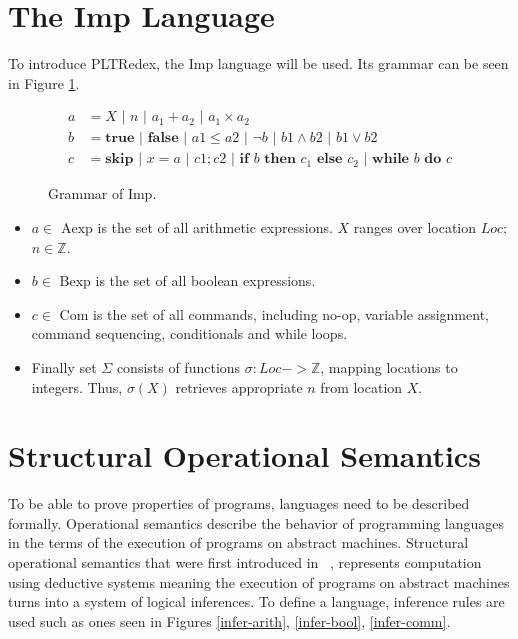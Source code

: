 
\section{The Imp Language}

To introduce PLTRedex, the Imp language will be used. Its grammar can be seen in Figure \ref{imp-grammar}.

\begin{figure}[htb]
\begin{align*}
a &= X \text{ | } n \text{ | } a_1 + a_2 \text{ | } a_1 \times a_2 \\
b &= \textbf{true} \text{ | } \textbf{false} \text{ | } a1 \leq a2 \text{ | } \neg b \text{ | } b1 \land b2 \text{ | } b1 \lor b2 \\
c &= \textbf{skip} \text{ | } x = a \text{ | } c1; c2 \text{ | } \textbf{if } b \textbf{ then } c_1 \textbf{ else } c_2 \text{ | } \textbf{while } b \textbf{ do } c
\end{align*}
\caption{Grammar of Imp.}
\label{imp-grammar}
\end{figure}

\begin{itemize}
\item $a \in \text{ Aexp}$ is the set of all arithmetic expressions. $X$ ranges over location $Loc$; $n \in \mathbb{Z}$.
\item $b \in \text{ Bexp}$ is the set of all boolean expressions.
\item $c \in \text{ Com}$ is the set of all commands, including no-op, variable assignment, command sequencing, conditionals and while loops.
\item Finally set $\Sigma$ consists of functions $\sigma: Loc -> \mathbb{Z}$, mapping locations to integers. Thus, $\sigma(X)$ retrieves appropriate $n$ from location $X$.
\end{itemize}


\section{Structural Operational Semantics}
To be able to prove properties of programs, languages need to be described formally. Operational semantics describe the behavior of programming languages in the terms of the execution of programs on abstract machines. Structural operational semantics that were first introduced in ~\cite{plotkin}, represents computation using deductive systems meaning the execution of programs on abstract machines turns into a system of logical inferences. To define a language, inference rules are used such as ones seen in Figures \ref{infer-arith}, \ref{infer-bool}, \ref{infer-comm}.

